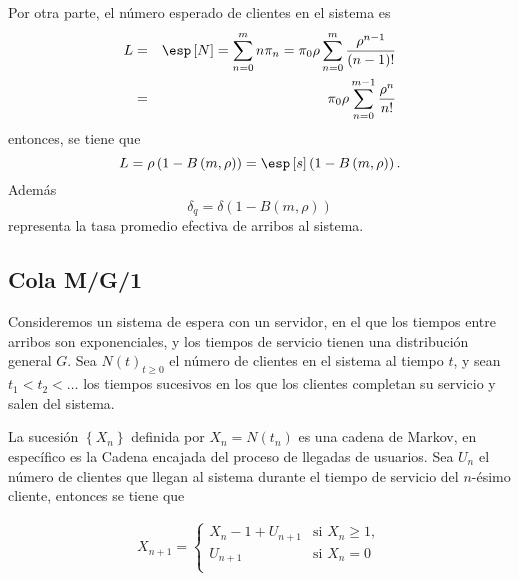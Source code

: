 Por otra parte, el n\'umero esperado de clientes en el sistema es
\begin{eqnarray*}
L&=&\esp\left[N\right]=\sum_{n=0}^{m}n\pi_{n}=\pi_{0}\rho\sum_{n=0}^{m}\frac{\rho^{n-1}}{\left(n-1\right)!}\\
&=&\pi_{0}\rho\sum_{n=0}^{m-1}\frac{\rho^{n}}{n!}
\end{eqnarray*}
entonces, se tiene que
\begin{equation}
L=\rho\left(1-B\left(m,\rho\right)\right)=\esp\left[s\right]\left(1-B\left(m,\rho\right)\right).
\end{equation}
Adem\'as
\begin{equation}
\delta_{q}=\delta\left(1-B\left(m,\rho\right)\right)
\end{equation}
representa la tasa promedio efectiva de arribos al sistema.
%
\subsection{Cola M/G/1}
%
Consideremos un sistema de espera con un servidor, en el que los tiempos entre arribos son exponenciales, y los tiempos de servicio tienen una distribuci\'on general $G$. Sea $N\left(t\right)_{t\geq0}$ el n\'umero de clientes en el sistema al tiempo $t$, y sean $t_{1}<t_{2}<\dots$ los tiempos sucesivos en los que los clientes completan su servicio y salen del sistema.

La sucesi\'on $\left\{X_{n}\right\}$ definida por
$X_{n}=N\left(t_{n}\right)$ es una cadena de Markov, en espec\'ifico es la Cadena encajada del proceso de llegadas de usuarios. Sea $U_{n}$ el n\'umero de clientes que llegan al sistema durante el tiempo de servicio del $n$-\'esimo cliente, entonces se tiene que

\begin{eqnarray*}
X_{n+1}=\left\{\begin{array}{cc}
X_{n}-1+U_{n+1} & \textrm{si }X_{n}\geq1,\\
U_{n+1} & \textrm{si }X_{n}=0\\
\end{array}\right.
\end{eqnarray*}

